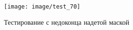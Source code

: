 \documentclass[a4paper,14pt]{article}
\begin{document}
	\begin{figure}[H]
		\centering
		\texttt{[image: image/test\_70]}
		\caption{Тестирование с недоконца надетой маской}
		\label{fig:test70}
	\end{figure}
	
	
	
\end{document}

